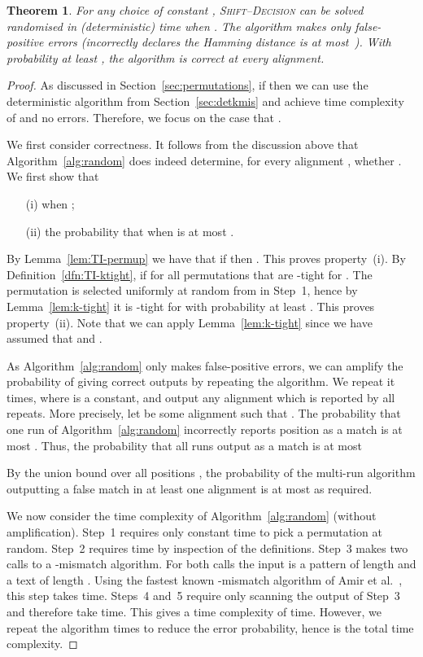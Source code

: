 \documentclass[11pt]{article}
\newcommand{\skDecision}{\textsc{Shift--Decision}\xspace}
\theoremstyle{plain}
\newtheorem{theorem}{Theorem}[]
\theoremstyle{definition}
\begin{document}
\begin{theorem}
    \label{thm:rankmis}
    For any choice of constant , \skDecision can be solved randomised in  (deterministic) time when . The algorithm makes only false-positive errors (incorrectly declares the Hamming distance is at most~). With probability at least , the algorithm is correct at every alignment.
\end{theorem}
\begin{proof}
    As discussed in Section~\ref{sec:permutations}, if  then we can use the deterministic algorithm from Section~\ref{sec:detkmis} and achieve time complexity of  and no errors. Therefore, we focus on the case that .

    We first consider correctness. It follows from the discussion above that Algorithm~\ref{alg:random} does indeed determine, for every alignment , whether . We first show that
\begin{enumerate}
        \item[(i)]  when ;
        \item[(ii)] the probability that  when   is at most .
    \end{enumerate}

    By Lemma~\ref{lem:TI-permup} we have that if  then . This proves property~(i). By Definition~\ref{dfn:TI-ktight},  if  for all permutations  that are -tight for . The permutation  is selected uniformly at random from  in Step~1, hence by Lemma~\ref{lem:k-tight} it is -tight for  with probability at least . This proves property~(ii). Note that we can apply Lemma~\ref{lem:k-tight} since we have assumed that  and .

    As Algorithm~\ref{alg:random} only makes false-positive errors, we can amplify the probability of giving correct outputs by repeating the algorithm. We repeat it  times, where  is a constant, and output any alignment which is reported by all repeats. More precisely, let  be some alignment such that . The probability that one run of Algorithm~\ref{alg:random} incorrectly reports position  as a match is at most . Thus, the probability that all runs output  as a match is at most

By the union bound over all positions , the probability of the multi-run algorithm outputting a false match in at least one alignment is at most  as required.

    We now consider the time complexity of Algorithm~\ref{alg:random} (without amplification). Step~1 requires only constant time to pick a permutation at random. Step~2 requires  time by inspection of the definitions. Step~3 makes two calls to a -mismatch algorithm. For both calls the input is a pattern of length  and a text of length . Using the fastest known -mismatch algorithm of Amir et al.~\cite{ALP:2004}, this step takes  time. Steps~4 and~5 require only scanning the output of Step~3 and therefore take  time. This gives a time complexity of  time. However, we repeat the algorithm  times to reduce the error probability, hence  is the total time complexity.
\end{proof}
\end{document}
